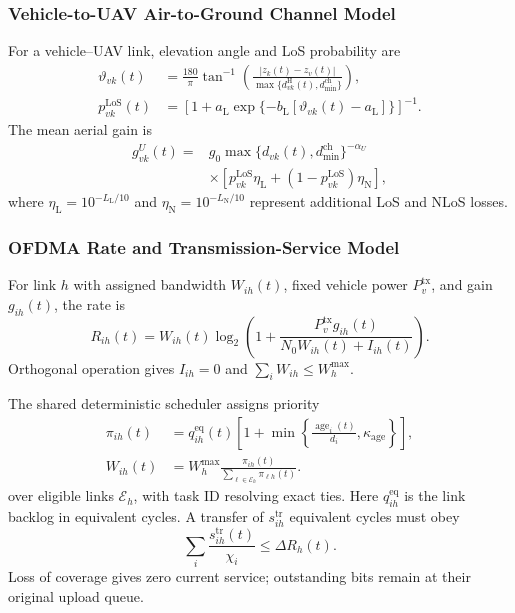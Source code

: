 \documentclass[journal]{IEEEtran}
\begin{document}
\subsubsection{Vehicle-to-UAV Air-to-Ground Channel Model}
For a vehicle--UAV link, elevation angle and LoS probability are
\begin{equation}
\begin{aligned}
\vartheta_{vk}(t)&=
\frac{180}{\pi}\tan^{-1}\!\left(
\frac{|z_k(t)-z_v(t)|}
{\max\{d_{vk}^{\mathrm H}(t),d_{\min}^{\mathrm{ch}}\}}\right),\\
p_{vk}^{\mathrm{LoS}}(t)&=
\left[1+a_{\mathrm L}
\exp\{-b_{\mathrm L}[\vartheta_{vk}(t)-a_{\mathrm L}]\}\right]^{-1}.
\end{aligned}
\label{eq:los}
\end{equation}
The mean aerial gain is
\begin{equation}
\begin{aligned}
g_{vk}^{U}(t)={}&g_0
\max\{d_{vk}(t),d_{\min}^{\mathrm{ch}}\}^{-\alpha_U}\\
&\times\left[p_{vk}^{\mathrm{LoS}}\eta_{\mathrm L}
+(1-p_{vk}^{\mathrm{LoS}})\eta_{\mathrm N}\right],
\end{aligned}
\label{eq:uav_gain}
\end{equation}
where $\eta_{\mathrm L}=10^{-L_{\mathrm L}/10}$ and
$\eta_{\mathrm N}=10^{-L_{\mathrm N}/10}$ represent additional LoS
and NLoS losses.

\subsubsection{OFDMA Rate and Transmission-Service Model}
For link $h$ with assigned bandwidth $W_{ih}(t)$, fixed vehicle power
$P_v^{\mathrm{tx}}$, and gain $g_{ih}(t)$, the rate is
\begin{equation}
R_{ih}(t)=W_{ih}(t)\log_2\!\left(
1+\frac{P_v^{\mathrm{tx}}g_{ih}(t)}
{N_0W_{ih}(t)+I_{ih}(t)}\right).
\label{eq:rate}
\end{equation}
Orthogonal operation gives $I_{ih}=0$ and
$\sum_iW_{ih}\le W_h^{\max}$.

The shared deterministic scheduler assigns priority
\begin{equation}
\begin{aligned}
\pi_{ih}(t)&=q_{ih}^{\mathrm{eq}}(t)
\left[1+\min\left\{\frac{\operatorname{age}_i(t)}{d_i},
\kappa_{\mathrm{age}}\right\}\right],\\
W_{ih}(t)&=W_h^{\max}
\frac{\pi_{ih}(t)}{\sum_{\ell\in\mathcal E_h}\pi_{\ell h}(t)}.
\end{aligned}
\label{eq:ofdma}
\end{equation}
over eligible links $\mathcal E_h$, with task ID resolving exact ties.
Here $q_{ih}^{\mathrm{eq}}$ is the link backlog in equivalent cycles.
A transfer of $s_{ih}^{\mathrm{tr}}$ equivalent cycles must obey
\begin{equation}
\sum_i\frac{s_{ih}^{\mathrm{tr}}(t)}{\chi_i}
\le\Delta R_h(t).
\label{eq:radio_capacity}
\end{equation}
Loss of coverage gives zero current service; outstanding bits remain
at their original upload queue.
\end{document}
